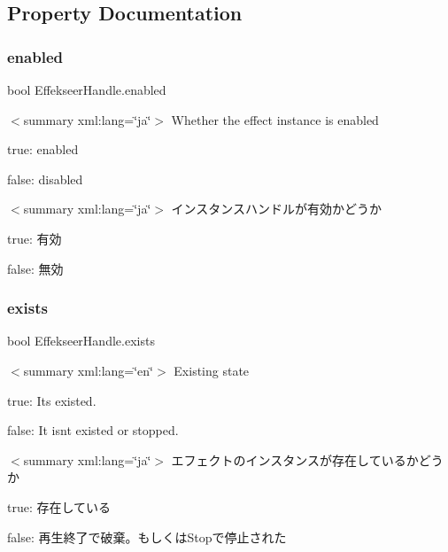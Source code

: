 \subsection{Property Documentation}
\mbox{\label{struct_effekseer_handle_a5b5edae1257e381de00a7bf9f546b37c}} 
\subsubsection{\texorpdfstring{enabled}{enabled}}
{\footnotesize\ttfamily bool Effekseer\+Handle.\+enabled\hspace{0.3cm}{\ttfamily [get]}}

$<$summary xml\+:lang=\char`\"{}ja\char`\"{}$>$ Whether the effect instance is enabled~\newline
 

true\+: enabled

false\+: disabled

$<$summary xml\+:lang=\char`\"{}ja\char`\"{}$>$ インスタンスハンドルが有効かどうか~\newline
 

true\+: 有効

false\+: 無効\mbox{\label{struct_effekseer_handle_ac1d253853e6471ce1e3c951491803c27}} 
\subsubsection{\texorpdfstring{exists}{exists}}
{\footnotesize\ttfamily bool Effekseer\+Handle.\+exists\hspace{0.3cm}{\ttfamily [get]}}

$<$summary xml\+:lang=\char`\"{}en\char`\"{}$>$ Existing state 

true\+: It\textquotesingle{}s existed.

false\+: It isn\textquotesingle{}t existed or stopped.

$<$summary xml\+:lang=\char`\"{}ja\char`\"{}$>$ エフェクトのインスタンスが存在しているかどうか 

true\+: 存在している

false\+: 再生終了で破棄。もしくは\+Stopで停止された\mbox{\label{struct_effekseer_handle_a3ba9bf72308429369214fd10ebb86ca6}} 
